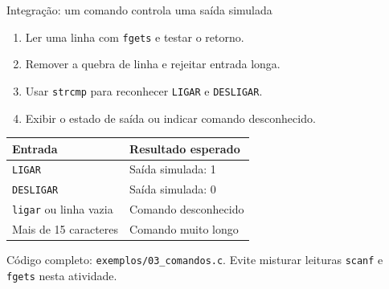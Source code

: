 \begin{frame}{Integração: um comando controla uma saída simulada}
\begin{enumerate}
\item Ler uma linha com \texttt{fgets} e testar o retorno.
\item Remover a quebra de linha e rejeitar entrada longa.
\item Usar \texttt{strcmp} para reconhecer \texttt{LIGAR} e \texttt{DESLIGAR}.
\item Exibir o estado de saída ou indicar comando desconhecido.
\end{enumerate}
\begin{center}
\begin{tabular}{ll}
\toprule
Entrada & Resultado esperado \\
\midrule
\texttt{LIGAR} & Saída simulada: 1 \\
\texttt{DESLIGAR} & Saída simulada: 0 \\
\texttt{ligar} ou linha vazia & Comando desconhecido \\
Mais de 15 caracteres & Comando muito longo \\
\bottomrule
\end{tabular}
\end{center}
\small Código completo: \texttt{exemplos/03\_comandos.c}. Evite misturar leituras \texttt{scanf} e \texttt{fgets} nesta atividade.
\end{frame}
